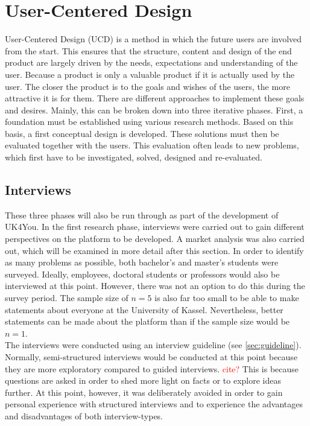 \section{User-Centered Design}
User-Centered Design (UCD) is a method in which the future users are involved from the start\cite{handbook-usability}\cite{key-principles-ucd}.
This ensures that the structure, content and design of the end product are largely driven by the needs, expectations and understanding of the user.
Because a product is only a valuable product if it is actually used by the user.
The closer the product is to the goals and wishes of the users, the more attractive it is for them.
There are different approaches to implement these goals and desires.
Mainly, this can be broken down into three iterative phases.
First, a foundation must be established using various research methods.
Based on this basis, a first conceptual design is developed.
These solutions must then be evaluated together with the users.
This evaluation often leads to new problems, which first have to be investigated, solved, designed and re-evaluated.\\

\subsection{Interviews}
These three phases will also be run through as part of the development of UK4You.
In the first research phase, interviews were carried out to gain different perspectives on the platform to be developed.
A market analysis was also carried out, which will be examined in more detail after this section.
In order to identify as many problems as possible, both bachelor's and master's students were surveyed.
Ideally, employees, doctoral students or professors would also be interviewed at this point.
However, there was not an option to do this during the survey period.
The sample size of $n=5$ is also far too small to be able to make statements about everyone at the University of Kassel.
Nevertheless, better statements can be made about the platform than if the sample size would be $n=1$.\\

The interviews were conducted using an interview guideline (see \autoref{sec:guideline}).
Normally, semi-structured interviews would be conducted at this point because they are more exploratory compared to guided interviews. \textcolor{red}{cite?}
This is because questions are asked in order to shed more light on facts or to explore ideas further.
At this point, however, it was deliberately avoided in order to gain personal experience with structured interviews and to experience the advantages and disadvantages of both interview-types.\\

